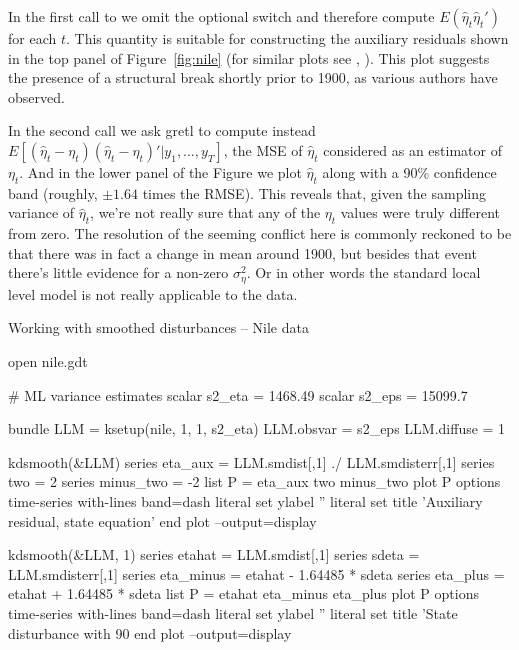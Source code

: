 \documentclass[a4paper]{article}
\begin{document}
In the first call to  we omit the optional switch and
therefore compute $E(\hat{\eta}_t\hat{\eta}_t')$ for each $t$. This
quantity is suitable for constructing the auxiliary residuals shown in
the top panel of Figure~\ref{fig:nile} (for similar plots see
\cite{koopman-etal99}, \cite{pelagatti11}).  This plot suggests the
presence of a structural break shortly prior to 1900, as various
authors have observed.

In the second  call we ask gretl to compute instead
$E[(\hat{\eta}_t-\eta_t)(\hat{\eta}_t-\eta_t)' | y_1,\ldots,y_T]$, the
MSE of $\hat{\eta}_t$ considered as an estimator of $\eta_t$. And in
the lower panel of the Figure we plot $\hat{\eta}_t$ along with a 90\%
confidence band (roughly, $\pm 1.64$ times the RMSE). This reveals
that, given the sampling variance of $\hat{\eta}_t$, we're not really
sure that any of the $\eta_t$ values were truly different from
zero. The resolution of the seeming conflict here is commonly reckoned
to be that there was in fact a change in mean around 1900, but besides
that event there's little evidence for a non-zero
$\sigma^2_{\eta}$. Or in other words the standard local level model is
not really applicable to the data.


\begin{script}[htbp]
  \caption{Working with smoothed disturbances -- Nile data}
  \label{script:auxres}
\begin{scode}
open nile.gdt

# ML variance estimates
scalar s2_eta = 1468.49
scalar s2_eps = 15099.7

bundle LLM = ksetup(nile, 1, 1, s2_eta)
LLM.obsvar = s2_eps
LLM.diffuse = 1

kdsmooth(&LLM)
series eta_aux = LLM.smdist[,1] ./ LLM.smdisterr[,1]
series two = 2
series minus_two = -2
list P = eta_aux two minus_two
plot P
  options time-series with-lines band=dash
  literal set ylabel ''
  literal set title 'Auxiliary residual, state equation'
end plot --output=display

kdsmooth(&LLM, 1)
series etahat = LLM.smdist[,1]
series sdeta = LLM.smdisterr[,1]
series eta_minus = etahat - 1.64485 * sdeta
series eta_plus = etahat + 1.64485 * sdeta
list P = etahat eta_minus eta_plus
plot P
  options time-series with-lines band=dash
  literal set ylabel ''
  literal set title 'State disturbance with 90%
end plot --output=display
\end{scode}
\end{script}
\end{document}
